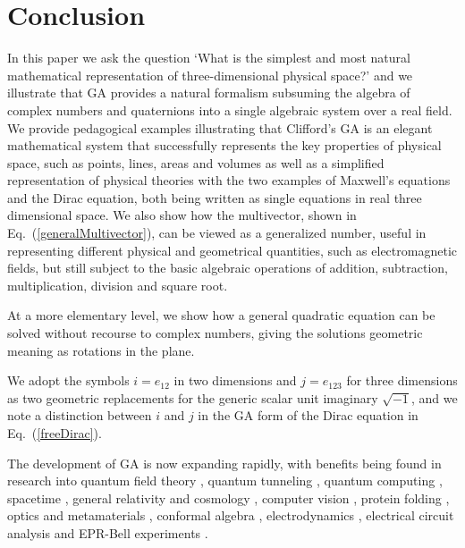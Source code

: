 \documentclass[prb,preprint]{revtex4}
\newcommand{\iGA}{{j}}
\newcommand{\iGAT}{{i}}
\begin{document}
\section{Conclusion}

In this paper we ask the question `What is the simplest and most natural mathematical representation of three-dimensional physical space?' and we illustrate that GA provides a natural formalism subsuming the algebra of complex numbers and quaternions into a single algebraic system over a real field.  We provide pedagogical examples illustrating that  Clifford's GA is an elegant mathematical system that successfully represents the key properties of physical space, such as points, lines, areas and volumes as well as a simplified representation of physical theories with the two examples of Maxwell's equations and the Dirac equation, both being written as single equations in real three dimensional space.  
We also show how the multivector, shown in Eq.~(\ref{generalMultivector}), can be viewed as a generalized number, useful in representing different physical and geometrical quantities, such as electromagnetic fields, but still subject to the basic algebraic operations of addition, subtraction, multiplication, division and square root.   

At a more elementary level, we show how a general quadratic equation can be solved without recourse to complex numbers, giving the solutions geometric meaning as rotations in the plane.

We adopt the symbols $ \iGAT = e_{12} $ in two dimensions and $ \iGA = e_{123} $ for three dimensions as two geometric replacements for the generic scalar unit imaginary $ \sqrt{-1} $, and we note a distinction between $ \iGAT $ and $ \iGA $ in the GA form of the Dirac equation in Eq.~(\ref{freeDirac}).  

The development of GA is now expanding rapidly, with benefits being found in research into quantum field theory \cite{Dolby2001}, quantum tunneling \cite{Doran1997}, quantum computing \cite{DoranParker:2001}, spacetime \cite{Hestenes2003,rowland2010,GA2}, general relativity and cosmology \cite{berrondo2012,Doran1993,Doran2005}, computer vision \cite{Doran1998}, protein folding \cite{Chys2012}, optics and metamaterials \cite{Santos2012,Sugon2004,Matos2010}, conformal algebra \cite{HuHao2012}, electrodynamics \cite{vold1993}, electrical circuit analysis \cite{Castro2012} and EPR-Bell experiments \cite{Christian2012}.
\end{document}
